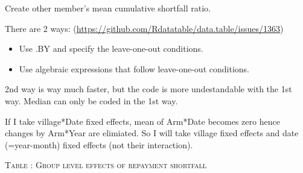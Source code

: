 Create other member's mean cumulative shortfall ratio. 
\begin{dinglist}{43}
\vspace{1.0ex}\setlength{\itemsep}{1.0ex}\setlength{\baselineskip}{12pt}
\item	There are 2 ways: {\tiny (\url{https://github.com/Rdatatable/data.table/issues/1363})}
	\begin{itemize}
	\vspace{1.0ex}\setlength{\itemsep}{1.0ex}\setlength{\baselineskip}{12pt}
	\item	Use \textsf{.BY} and specify the leave-one-out conditions.
	\item	Use algebraic expressions that follow leave-one-out conditions.
	\end{itemize}
2nd way is way much faster, but the code is more undestandable with the 1st way. Median can only be coded in the 1st way.
\end{dinglist}



If I take village*Date fixed effects, mean of Arm*Date becomes zero hence changes by Arm*Year are elimiated. So I will take village fixed effects and date (=year-month) fixed effects (not their interaction).





\hspace{-1cm}\begin{minipage}[t]{14cm}
\hfil\textsc{\normalsize Table \thetable: Group level effects of repayment shortfall\label{tab shortfall group}}\\
\setlength{\tabcolsep}{1pt}
\setlength{\baselineskip}{8pt}
\renewcommand{\arraystretch}{.6}
\hfil{}
\end{minipage}

